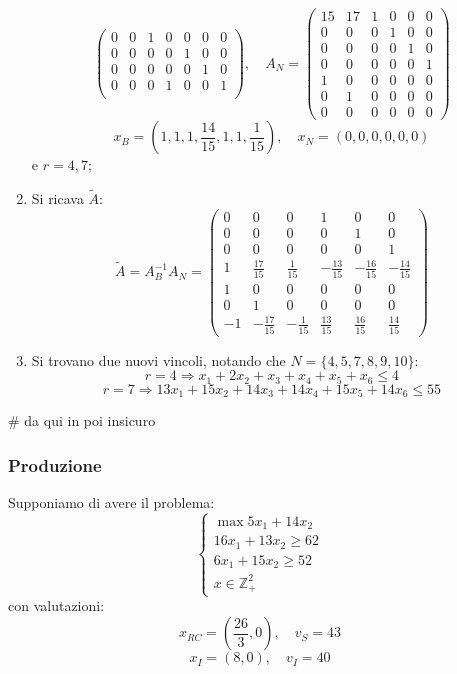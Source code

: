 \documentclass[a4paper,11pt]{article}
\begin{document}
\begin{enumerate}
$$\begin{pmatrix}
		0 & 0 & 1 & 0 & 0 & 0 & 0 \\
		0 & 0 & 0 & 0 & 1 & 0 & 0 \\
		0 & 0 & 0 & 0 & 0 & 1 & 0 \\
		0 & 0 & 0 & 1 & 0 & 0 & 1 \\
	\end{pmatrix}, \quad 
	A_N = 
	\begin{pmatrix}
		15 & 17 & 1 & 0 & 0 & 0 \\ 
		0 & 0 & 0 & 1 & 0 & 0 \\ 
		0 & 0 & 0 & 0 & 1 & 0 \\ 
		0 & 0 & 0 & 0 & 0 & 1 \\ 
		1 & 0 & 0 & 0 & 0 & 0 \\ 
		0 & 1 & 0 & 0 & 0 & 0 \\
		0 & 0 & 0 & 0 & 0 & 0
	\end{pmatrix}
	$$
	$$
	x_B =
	\left(
		1, 1, 1, \frac{14}{15}, 1, 1, \frac{1}{15}
	\right), \quad 
	x_N = 
	\left(
		0, 0, 0, 0, 0, 0
	\right)
	$$
	e $r= 4, 7$;
\item Si ricava $\tilde{A}$:
	$$
	\tilde{A} = A_B^{-1} A_N = 
	\begin{pmatrix}
		0 & 0 & 0 & 1 & 0 & 0 \\ 
		0 & 0 & 0 & 0 & 1 & 0 \\ 
		0 & 0 & 0 & 0 & 0 & 1 \\ 
		1 & \frac{17}{15} & \frac{1}{15} & -\frac{13}{15} & -\frac{16}{15} & -\frac{14}{15} \\ 
		1 & 0 & 0 & 0 & 0 & 0 \\ 
		0 & 1 & 0 & 0 & 0 & 0 \\ 
		-1 & -\frac{17}{15} & -\frac{1}{15} & \frac{13}{15} & \frac{16}{15} & \frac{14}{15}
	\end{pmatrix} 
	$$
\item Si trovano due nuovi vincoli, notando che $N = \{ 4, 5, 7, 8, 9, 10 \}$:
$$
r=4 \Rightarrow x_1 + 2x_2 + x_3 + x_4 + x_5 + x_6 \leq 4 
$$
$$
r=7 \Rightarrow 13 x_1 + 15 x_2 + 14 x_3 + 14 x_4 + 15 x_5 + 14 x_6 \leq 55
$$
\end{enumerate}

# da qui in poi insicuro

\subsubsection{Produzione}
Supponiamo di avere il problema:
\[
	\begin{cases}
		\max 5 x_1 + 14 x_2 \\ 
		16 x_1 + 13 x_2 \geq 62 \\ 
		6 x_1 + 15 x_2 \geq 52 \\
		x \in \mathbb{Z}^2_+
	\end{cases}
\]
con valutazioni:
$$ x_{RC} = \left( \frac{26}{3}, 0 \right), \quad v_S = 43 $$
$$ x_I = \left( 8, 0 \right), \quad  v_I = 40 $$
\end{document}
